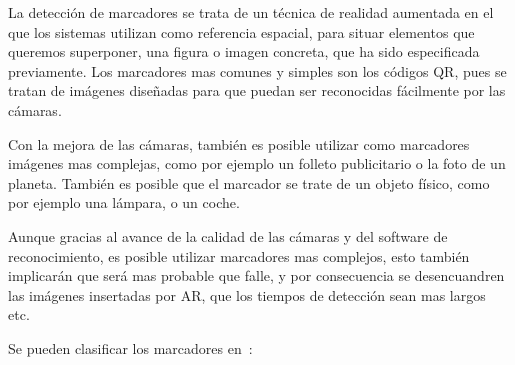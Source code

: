 La detección de marcadores se trata de un técnica de realidad aumentada en el que los sistemas utilizan como referencia espacial, para situar elementos que queremos superponer, una figura o imagen concreta, que ha sido especificada previamente. Los marcadores mas comunes y simples son los códigos QR, pues se tratan de imágenes diseñadas para que puedan ser reconocidas fácilmente por las cámaras.

\label{marcadorSencillo}

Con la mejora de las cámaras, también es posible utilizar como marcadores imágenes mas complejas, como por ejemplo un folleto publicitario o la foto de un planeta.
También es posible que el marcador se trate de un objeto físico, como por ejemplo una lámpara, o un coche.


Aunque gracias al avance de la calidad de las cámaras y del software de reconocimiento, es posible utilizar marcadores mas complejos, esto también implicarán que será mas probable que falle, y por consecuencia se desencuandren las imágenes insertadas por AR, que los tiempos de detección sean mas largos etc.

Se pueden clasificar los marcadores en~\cite{linowes_babilinski_2017}:




